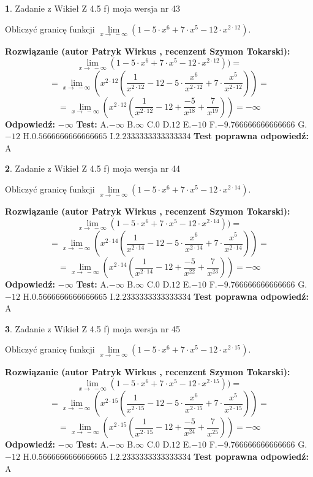 \documentclass[12pt, a4paper]{article}
\theoremstyle{definition} %
\newtheorem{zad}{}
\newcommand{\zadStart}[1]{\begin{zad}#1\newline}
\newcommand{\zadStop}{\end{zad}}
\newcommand{\rozwStart}[2]{\noindent \textbf{Rozwiązanie (autor #1 , recenzent #2): }\newline}
\newcommand{\rozwStop}{\newline}
\newcommand{\odpStart}{\noindent \textbf{Odpowiedź:}\newline}
\newcommand{\odpStop}{\newline}
\newcommand{\testStart}{\noindent \textbf{Test:}\newline}
\newcommand{\testStop}{\newline}
\newcommand{\kluczStart}{\noindent \textbf{Test poprawna odpowiedź:}\newline}
\newcommand{\kluczStop}{\newline}
\begin{document}
\zadStart{Zadanie z Wikieł Z 4.5 f) moja wersja nr 43}


Obliczyć granicę funkcji  $\lim\limits_{x\to\ -\infty}(1 - 5 \cdot x^{6}+7 \cdot x^{5}- 12 \cdot x^{2\cdot12})$.
\zadStop
\rozwStart{Patryk Wirkus}{Szymon Tokarski}
$$\lim\limits_{x\to\ -\infty}(1 - 5 \cdot x^{6}+7 \cdot x^{5}- 12 \cdot x^{2\cdot12}))=$$
$$=\lim\limits_{x\to\ -\infty}(x^{2\cdot12}(\frac{1}{x^{2\cdot12}}-12 -5 \cdot \frac{x^{6}}{x^{2\cdot12}}+7 \cdot \frac{x^{5}}{x^{2\cdot12}}))=$$
$$=\lim\limits_{x\to\ -\infty}(x^{2\cdot12}(\frac{1}{x^{2\cdot12}}-12 + \frac{-5}{x^{18}}+ \frac{7}{x^{19}}))=-\infty$$
\rozwStop
\odpStart
$-\infty$
\odpStop
\testStart
A.$-\infty$ B.$\infty$ C.$0$ D.$12$ E.$-10$
F.$-9.766666666666666$ G.$-12$
H.$0.5666666666666665$
I.$2.2333333333333334$
\testStop
\kluczStart
A
\kluczStop



\zadStart{Zadanie z Wikieł Z 4.5 f) moja wersja nr 44}


Obliczyć granicę funkcji  $\lim\limits_{x\to\ -\infty}(1 - 5 \cdot x^{6}+7 \cdot x^{5}- 12 \cdot x^{2\cdot14})$.
\zadStop
\rozwStart{Patryk Wirkus}{Szymon Tokarski}
$$\lim\limits_{x\to\ -\infty}(1 - 5 \cdot x^{6}+7 \cdot x^{5}- 12 \cdot x^{2\cdot14}))=$$
$$=\lim\limits_{x\to\ -\infty}(x^{2\cdot14}(\frac{1}{x^{2\cdot14}}-12 -5 \cdot \frac{x^{6}}{x^{2\cdot14}}+7 \cdot \frac{x^{5}}{x^{2\cdot14}}))=$$
$$=\lim\limits_{x\to\ -\infty}(x^{2\cdot14}(\frac{1}{x^{2\cdot14}}-12 + \frac{-5}{x^{22}}+ \frac{7}{x^{23}}))=-\infty$$
\rozwStop
\odpStart
$-\infty$
\odpStop
\testStart
A.$-\infty$ B.$\infty$ C.$0$ D.$12$ E.$-10$
F.$-9.766666666666666$ G.$-12$
H.$0.5666666666666665$
I.$2.2333333333333334$
\testStop
\kluczStart
A
\kluczStop



\zadStart{Zadanie z Wikieł Z 4.5 f) moja wersja nr 45}


Obliczyć granicę funkcji  $\lim\limits_{x\to\ -\infty}(1 - 5 \cdot x^{6}+7 \cdot x^{5}- 12 \cdot x^{2\cdot15})$.
\zadStop
\rozwStart{Patryk Wirkus}{Szymon Tokarski}
$$\lim\limits_{x\to\ -\infty}(1 - 5 \cdot x^{6}+7 \cdot x^{5}- 12 \cdot x^{2\cdot15}))=$$
$$=\lim\limits_{x\to\ -\infty}(x^{2\cdot15}(\frac{1}{x^{2\cdot15}}-12 -5 \cdot \frac{x^{6}}{x^{2\cdot15}}+7 \cdot \frac{x^{5}}{x^{2\cdot15}}))=$$
$$=\lim\limits_{x\to\ -\infty}(x^{2\cdot15}(\frac{1}{x^{2\cdot15}}-12 + \frac{-5}{x^{24}}+ \frac{7}{x^{25}}))=-\infty$$
\rozwStop
\odpStart
$-\infty$
\odpStop
\testStart
A.$-\infty$ B.$\infty$ C.$0$ D.$12$ E.$-10$
F.$-9.766666666666666$ G.$-12$
H.$0.5666666666666665$
I.$2.2333333333333334$
\testStop
\kluczStart
A
\kluczStop
\end{document}
